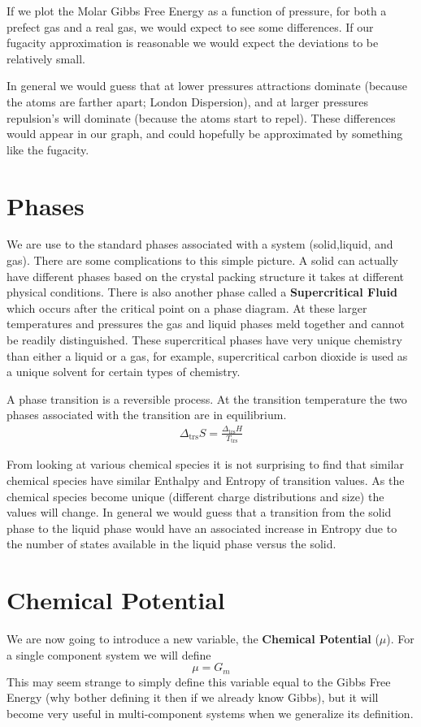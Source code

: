 \documentclass{article}
\newcommand{\be}{\begin{equation}}
\newcommand{\ee}{\end{equation}}
\begin{document}
If we plot the Molar Gibbs Free Energy as a function of pressure, for both a prefect gas and a real gas, we would expect to see some differences. 
If our fugacity approximation is reasonable we would expect the deviations to be relatively small. 

In general we would guess that at lower pressures attractions dominate (because the atoms are farther apart; London Dispersion), and at larger pressures repulsion's will dominate (because the atoms start to repel). 
These differences would appear in our graph, and could hopefully be approximated by something like the fugacity. 

\section*{Phases}
We are use to the standard phases associated with a system (solid,liquid, and gas). 
There are some complications to this simple picture. 
A solid can actually have different phases based on the crystal packing structure it takes at different physical conditions. 
There is also another phase called a \textbf{Supercritical Fluid} which occurs after the critical point on a phase diagram. 
At these larger temperatures and pressures the gas and liquid phases meld together and cannot be readily distinguished. 
These supercritical phases have very unique chemistry than either a liquid or a gas, for example, supercritical carbon dioxide is used as a unique solvent for certain types of chemistry.

A phase transition is a reversible process.
At the transition temperature the two phases associated with the transition are in equilibrium. 
\be
\begin{split}
\Delta_{\text{trs}}S = \frac{\Delta_{\text{trs}}H}{T_{\text{trs}}}
\end{split}
\ee

From looking at various chemical species it is not surprising to find that similar chemical species have similar Enthalpy and Entropy of transition values. 
As the chemical species become unique (different charge distributions and size) the values will change. 
In general we would guess that a transition from the solid phase to the liquid phase would have an associated increase in Entropy due to the number of states available in the liquid phase versus the solid. 

\section*{Chemical Potential}
We are now going to introduce a new variable, the \textbf{Chemical Potential} ($\mu$).
For a single component system we will define
\be
\mu = G_m
\ee
This may seem strange to simply define this variable equal to the Gibbs Free Energy (why bother defining it then if we already know Gibbs), but it will become very useful in multi-component systems when we generalize its definition. 
\end{document}
